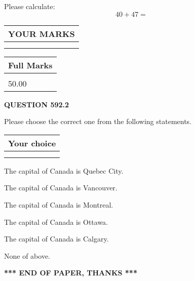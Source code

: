 \documentclass[12pt]{article}
\begin{document}
  
 
Please calculate:
\begin{equation}
40 +  %
47 = \nonumber
\end{equation}
 

 

 
  
\vspace{0.2in}
  
\noindent\begin{tabular}{|l|}
\hline
 YOUR MARKS  \\
\hline
 \\ 
 \\ 
\hline
\end{tabular}
\hspace{0.05in} \begin{tabular}{|l|}
\hline
 Full Marks  \\
\hline
 \\ 
50.00 \\
\hline
\end{tabular}
{\textbf{\Large{QUESTION
592.2 
}}}
  
  
Please choose the correct one from the following statements.
  
  
\noindent\hspace{3.0in} \begin{tabular}{|l|}
\hline
Your choice \\
\hline
 \\ 
 \\ 
\hline
\end{tabular}
  
  
 
 
The capital of Canada is Quebec City.
 
 
The capital of Canada is Vancouver.
 
 
The capital of Canada is Montreal.
 
 
The capital of Canada is Ottawa.
 
 
The capital of Canada is Calgary.
 
 
 None of above.
 
 
   
   
 \vspace{0.2in}
 
   
   
   
   
\vspace{1.0in} 
{\textbf{\large{ *** END OF PAPER, THANKS *** }}} 
   
\end{document}
